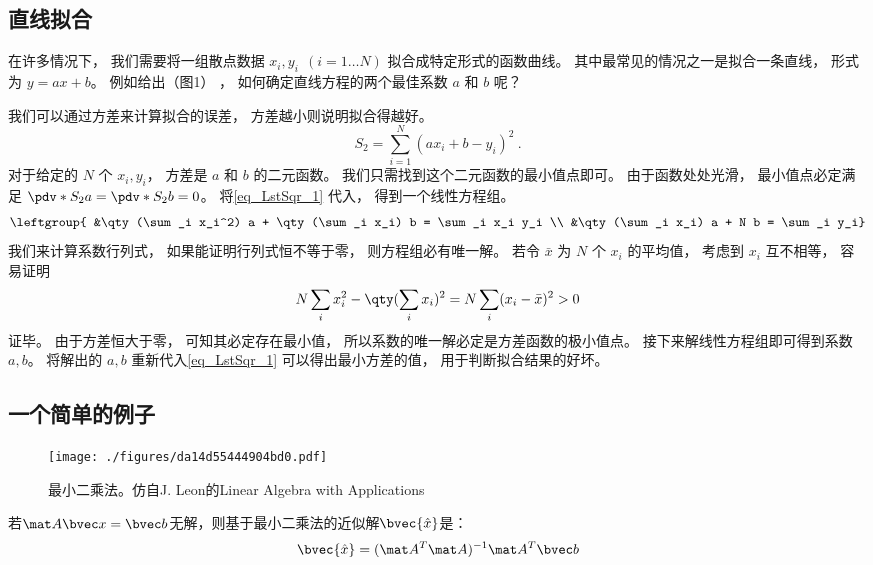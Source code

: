 
\begin{issues}
\issueTODO
\end{issues}


\subsection{直线拟合}
在许多情况下， 我们需要将一组散点数据 $x_i, y_i \ \ (i = 1\dots N)$ 拟合成特定形式的函数曲线。 其中最常见的情况之一是拟合一条直线， 形式为 $y = ax + b$。 例如给出（图1）%
， 如何确定直线方程的两个最佳系数 $a$ 和 $b$ 呢？

我们可以通过方差来计算拟合的误差， 方差越小则说明拟合得越好。
\begin{equation}\label{eq_LstSqr_1}
S_2 = \sum_{i = 1}^N (a x_i + b - y_i)^2~.
\end{equation}
对于给定的 $N$ 个 $x_i, y_i$， 方差是 $a$ 和 $b$ 的二元函数。 我们只需找到这个二元函数的最小值点即可。 由于函数处处光滑， 最小值点必定满足 $\pdv*{S_2}{a} = \pdv*{S_2}{b} = 0$。 将\autoref{eq_LstSqr_1} 代入， 得到一个线性方程组。
\begin{equation}
\leftgroup{
&\qty(\sum_i x_i^2) a + \qty(\sum_i x_i) b = \sum_i x_i y_i \\
&\qty(\sum_i x_i) a + N b = \sum_i y_i}
\end{equation}
我们来计算系数行列式， 如果能证明行列式恒不等于零， 则方程组必有唯一解。%
若令 $\bar x$ 为 $N$ 个 $x_i$ 的平均值， 考虑到 $x_i$ 互不相等， 容易证明
\begin{equation}
N\sum_i x_i^2 - \qty(\sum_i x_i)^2 = N\sum_i (x_i - \bar x)^2 > 0
\end{equation}
证毕。 由于方差恒大于零， 可知其必定存在最小值， 所以系数的唯一解必定是方差函数的极小值点。 接下来解线性方程组即可得到系数 $a, b$。 将解出的 $a,b$ 重新代入\autoref{eq_LstSqr_1} 可以得出最小方差的值， 用于判断拟合结果的好坏。

\subsection{一个简单的例子}
\begin{figure}[ht]
\centering
\texttt{[image: ./figures/da14d55444904bd0.pdf]}
\caption{最小二乘法。仿自J. Leon的Linear Algebra with Applications} \label{fig_LstSqr_1}
\end{figure}
若$\mat A \bvec x = \bvec b$无解，则基于最小二乘法的近似解$\bvec {\hat x} $是：
\begin{equation}
\bvec {\hat x} = (\mat A^T \mat A)^{-1}\mat A^T \bvec b
\end{equation}

